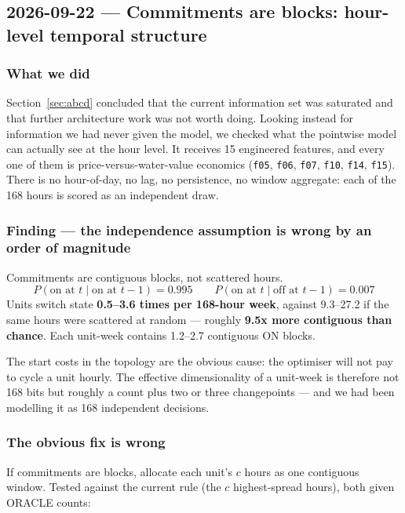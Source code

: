 \subsection{2026-09-22 --- Commitments are blocks: hour-level temporal structure}
\label{sec:temporal}

\subsubsection*{What we did}

Section~\ref{sec:abcd} concluded that the current information set was saturated and that further
architecture work was not worth doing. Looking instead for information we had never given the
model, we checked what the pointwise model can actually see at the hour level. It receives 15
engineered features, and every one of them is price-versus-water-value economics
(\texttt{f05}, \texttt{f06}, \texttt{f07}, \texttt{f10}, \texttt{f14}, \texttt{f15}). There is no
hour-of-day, no lag, no persistence, no window aggregate: each of the 168 hours is scored as an
independent draw.

\subsubsection*{Finding --- the independence assumption is wrong by an order of magnitude}

\begin{finding}
Commitments are contiguous blocks, not scattered hours.
\[
  P(\text{on at } t \mid \text{on at } t{-}1) = 0.995 \qquad
  P(\text{on at } t \mid \text{off at } t{-}1) = 0.007
\]
Units switch state \textbf{0.5--3.6 times per 168-hour week}, against 9.3--27.2 if the same hours
were scattered at random --- roughly \textbf{9.5x more contiguous than chance}. Each unit-week
contains 1.2--2.7 contiguous ON blocks.
\end{finding}

The start costs in the topology are the obvious cause: the optimiser will not pay to cycle a unit
hourly. The effective dimensionality of a unit-week is therefore not 168 bits but roughly a count
plus two or three changepoints --- and we had been modelling it as 168 independent decisions.

\subsubsection*{The obvious fix is wrong}

If commitments are blocks, allocate each unit's $c$ hours as one contiguous window. Tested
against the current rule (the $c$ highest-spread hours), both given ORACLE counts:

